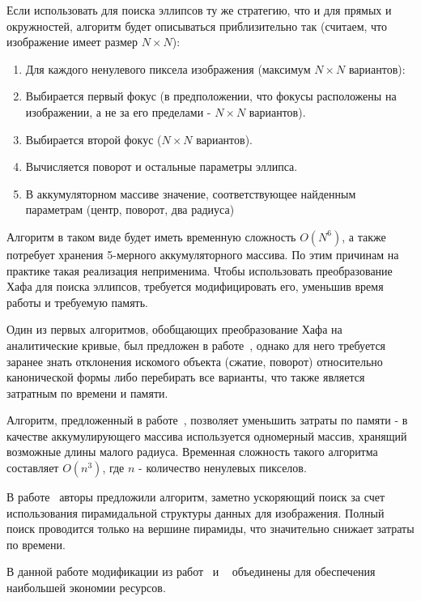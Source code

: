 Если использовать для поиска эллипсов ту же стратегию, что и для прямых и окружностей, алгоритм будет описываться приблизительно так (считаем, что изображение имеет размер $N \times N$):
\begin{enumerate}
\item Для каждого ненулевого пиксела изображения (максимум $N \times N$ вариантов):
\item Выбирается первый фокус (в предположении, что фокусы расположены на изображении, а не за его пределами - $N \times N$ вариантов).
\item Выбирается второй фокус ($N \times N$ вариантов).
\item Вычисляется поворот и остальные параметры эллипса.
\item В аккумуляторном массиве значение, соответствующее найденным параметрам (центр, поворот, два радиуса)
\end{enumerate}

Алгоритм в таком виде будет иметь временную сложность \(O(N^6)\), а также потребует хранения 5-мерного аккумуляторного массива. По этим причинам на практике такая реализация неприменима.
Чтобы использовать преобразование Хафа для поиска эллипсов, требуется модифицировать его, уменьшив время работы и требуемую память.

Один из первых алгоритмов, обобщающих преобразование Хафа на аналитические кривые, был предложен в работе~\autocite{Ballard}, 
однако для него требуется заранее знать отклонения искомого объекта (сжатие, поворот) относительно канонической формы либо перебирать все варианты, что также является затратным по времени и памяти.

Алгоритм, предложенный в работе~\autocite{OneDim}, позволяет уменьшить затраты по памяти - в качестве аккумулирующего массива используется одномерный массив, хранящий возможные длины малого радиуса.
Временная сложность такого алгоритма составляет \(O(n^3)\), где \(n\) - количество ненулевых пикселов.

В работе~\autocite{Chien} авторы предложили алгоритм, заметно ускоряющий поиск за счет использования пирамидальной структуры данных для изображения. 
Полный поиск проводится только на вершине пирамиды, что значительно снижает затраты по времени.

В данной работе модификации из работ~\autocite{OneDim} и ~\autocite{Chien} объединены для обеспечения наибольшей экономии ресурсов.

